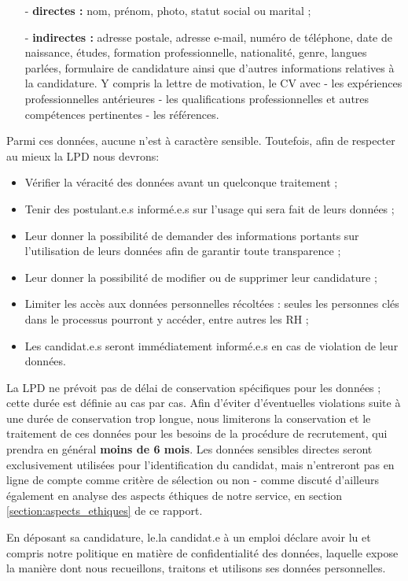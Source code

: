 \begin{enumerate}
\item[-] \textbf{directes :} nom, prénom, photo, statut social ou marital ; \\
\item[-] \textbf{indirectes :} adresse postale, adresse e-mail, numéro de téléphone, date de naissance, études, formation professionnelle, nationalité, genre, langues parlées, formulaire de candidature ainsi que d'autres informations relatives à la candidature. Y compris la lettre de motivation, le CV avec - les expériences professionnelles antérieures - les qualifications professionnelles et autres compétences pertinentes - les références.\\
\end{enumerate}

Parmi ces données, aucune n'est à caractère sensible. Toutefois, afin de respecter au mieux la LPD nous devrons:\newline

\begin{itemize}
    \item Vérifier la véracité des données avant un quelconque traitement ;\\
    \item Tenir des postulant.e.s informé.e.s sur l'usage qui sera fait de leurs données ;\\
    \item Leur donner la possibilité de demander des informations portants sur l'utilisation de leurs données afin de garantir toute transparence ;\\
    \item Leur donner la possibilité de modifier ou de supprimer leur candidature ;\\
    \item Limiter les accès aux données personnelles récoltées : seules les personnes clés dans le processus pourront y accéder, entre autres les RH ;\\
    \item Les candidat.e.s seront immédiatement informé.e.s en cas de violation de leur données. \\
\end{itemize}

 La LPD ne prévoit pas de délai de conservation spécifiques pour les données ; cette durée est définie au cas par cas. Afin d'éviter d'éventuelles violations suite à une durée de conservation trop longue, nous limiterons la conservation et le traitement de ces données  pour les besoins de la procédure de recrutement, qui prendra en général \textbf{moins de 6 mois}. Les données sensibles directes seront exclusivement utilisées pour l'identification du candidat, mais n'entreront pas en ligne de compte comme critère de sélection ou non - comme discuté d'ailleurs également en analyse des aspects éthiques de notre service, en section \ref{section:aspects_ethiques} de ce rapport.\newline
 
En déposant sa candidature, le.la candidat.e à un emploi déclare avoir lu et compris notre politique en matière de confidentialité des données, laquelle expose la manière dont nous recueillons, traitons et utilisons ses données personnelles.